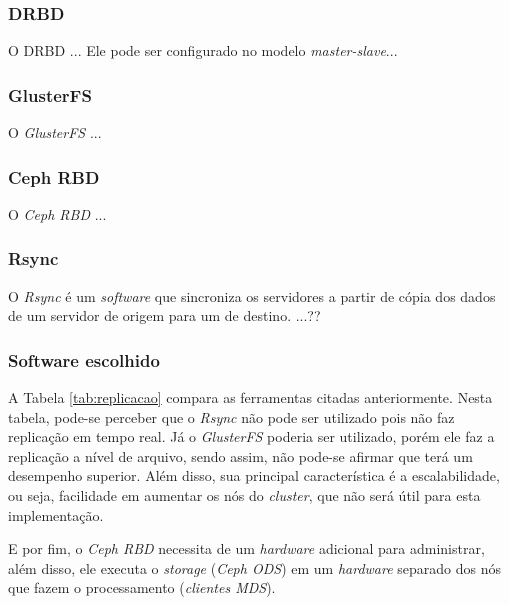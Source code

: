 \subsubsection{DRBD}
\label{section:drbd}
O \ac{DRBD} \cite{drbd} ...
Ele pode ser configurado no modelo \textit{master-slave}...

\subsubsection{GlusterFS}
\label{section:glusterfs}
O \textit{GlusterFS} \cite{glusterfs} ...

\subsubsection{Ceph RBD}
\label{section:cephrbd}
O \textit{Ceph RBD} \cite{cephrbd} ...

\subsubsection{Rsync}
\label{section:rsync}
O \textit{Rsync} \cite{rsync} é um \textit{software} que sincroniza os servidores a partir de cópia dos dados de um servidor de origem 
para um de destino. ...?? 



\subsubsection{Software escolhido}
\label{section:replicacaoescolhido}

A Tabela \ref{tab:replicacao} compara as ferramentas citadas anteriormente. Nesta tabela, pode-se perceber que o \textit{Rsync} não pode ser
utilizado pois não faz replicação em tempo real. Já o \textit{GlusterFS} poderia ser utilizado, porém ele faz a replicação a nível de arquivo, 
sendo assim, não pode-se afirmar que terá um desempenho superior. Além disso, sua principal característica é a escalabilidade, ou seja, 
facilidade em aumentar os nós do \textit{cluster}, que não será útil para esta implementação.

E por fim, o \textit{Ceph RBD} necessita de um \textit{hardware} adicional para administrar, além disso, ele executa o \textit{storage} 
(\textit{Ceph ODS}) em um \textit{hardware} separado dos nós que fazem o processamento (\textit{clientes MDS}). %


